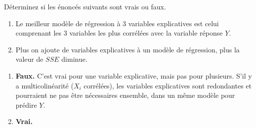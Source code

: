\begin{exercice}
Déterminez si les énoncés suivants sont vrais ou faux.
\begin{enumerate}[label=(\alph*)]
  \item Le meilleur modèle de régression à 3 variables explicatives est celui comprenant les
  3 variables les plus corrélées avec la variable réponse $Y$.
  \item Plus on ajoute de variables explicatives à un modèle de régression, plus la valeur
  de $SSE$ diminue.
\end{enumerate}
\begin{solution}
\begin{enumerate}[label=(\alph*)]
  \item \textbf{Faux.} C'est vrai pour une variable explicative, mais pas pour plusieurs.
  S'il y a multicolinéarité ($X_i$ corrélées), les variables explicatives sont redondantes
  et pourraient ne pas être nécessaires ensemble, dans un même modèle pour prédire $Y$.
  \item \textbf{Vrai.}
\end{enumerate}
\end{solution}
\end{exercice}

